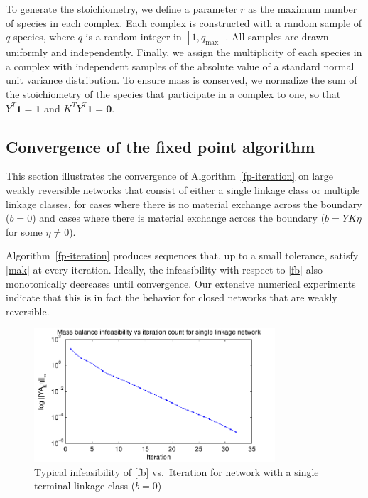 \documentclass[smallextended]{svjour3}       %
\newcommand*{\0}{\mathbf{0}}
\newcommand*{\1}{\mathbf{1}}
\begin{document}
To generate the stoichiometry, we define a parameter $r$ as the maximum 
number of species in each complex. Each complex is constructed with a random
sample of $q$ species, where $q$ is a random integer in $[1,q_{\max}]$.  All samples
are drawn uniformly and independently.  Finally, we assign the multiplicity of
each species in a complex with independent samples of the absolute value of a
standard normal unit variance distribution. To ensure mass is conserved, we
normalize the sum of the stoichiometry of the species that participate in a
complex to one, so that $Y^T\1 = \1$ and $K^TY^T \1 = \0$. 

\subsection{Convergence of the fixed point algorithm}
\label{scn:convergence} 

This section illustrates the convergence of Algorithm~\ref{fp-iteration} on
large weakly reversible networks that consist of either a single linkage class 
or multiple linkage classes, for cases where there is no material exchange
across the boundary ($b=0$) and cases where there is material exchange
across the boundary ($b=YK\eta$ for some $\eta \neq 0$).

Algorithm~\ref{fp-iteration} produces sequences that, up to a small tolerance,
satisfy \eqref{mak} at every iteration. Ideally, the infeasibility with 
respect to \eqref{fb} also monotonically decreases until convergence.  Our
extensive numerical experiments indicate that this is in fact the behavior for
closed networks that are weakly reversible.

\begin{figure}%
   \centering 
   \includegraphics[width=0.8\textwidth]{InfeasibilityVsIteration}
   \caption{Typical infeasibility of \eqref{fb} vs.\ Iteration for network with a
            single terminal-linkage class ($b=0$)} 
   \label{fig:typical-infeas-single} 
\end{figure}
\end{document}

